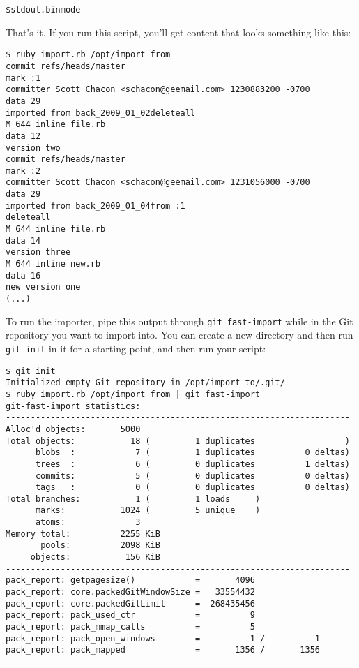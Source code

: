 \documentclass[a4paper]{book}
\begin{document}
\begin{shaded}\begin{verbatim}
$stdout.binmode
\end{verbatim}\end{shaded}

That's it. If you run this script, you'll get content that looks something like this:

\begin{shaded}\begin{verbatim}
$ ruby import.rb /opt/import_from
commit refs/heads/master
mark :1
committer Scott Chacon <schacon@geemail.com> 1230883200 -0700
data 29
imported from back_2009_01_02deleteall
M 644 inline file.rb
data 12
version two
commit refs/heads/master
mark :2
committer Scott Chacon <schacon@geemail.com> 1231056000 -0700
data 29
imported from back_2009_01_04from :1
deleteall
M 644 inline file.rb
data 14
version three
M 644 inline new.rb
data 16
new version one
(...)
\end{verbatim}\end{shaded}

To run the importer, pipe this output through \texttt{git fast-import} while in the Git repository you want to import into. You can create a new directory and then run \texttt{git init} in it for a starting point, and then run your script:

\begin{shaded}\begin{verbatim}
$ git init
Initialized empty Git repository in /opt/import_to/.git/
$ ruby import.rb /opt/import_from | git fast-import
git-fast-import statistics:
---------------------------------------------------------------------
Alloc'd objects:       5000
Total objects:           18 (         1 duplicates                  )
      blobs  :            7 (         1 duplicates          0 deltas)
      trees  :            6 (         0 duplicates          1 deltas)
      commits:            5 (         0 duplicates          0 deltas)
      tags   :            0 (         0 duplicates          0 deltas)
Total branches:           1 (         1 loads     )
      marks:           1024 (         5 unique    )
      atoms:              3
Memory total:          2255 KiB
       pools:          2098 KiB
     objects:           156 KiB
---------------------------------------------------------------------
pack_report: getpagesize()            =       4096
pack_report: core.packedGitWindowSize =   33554432
pack_report: core.packedGitLimit      =  268435456
pack_report: pack_used_ctr            =          9
pack_report: pack_mmap_calls          =          5
pack_report: pack_open_windows        =          1 /          1
pack_report: pack_mapped              =       1356 /       1356
---------------------------------------------------------------------
\end{verbatim}\end{shaded}
\end{document}
